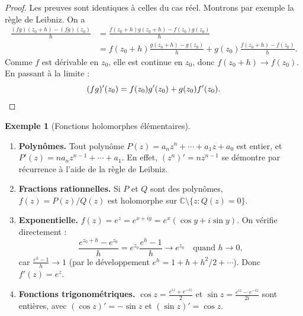 \documentclass[12pt,a4paper,openany]{book}
\theoremstyle{definition}
\newtheorem{exemple}[definition]{Exemple}
\theoremstyle{plain}
\theoremstyle{remark}
\newcommand{\C}{\mathbb{C}}
\begin{document}
\begin{proof}
Les preuves sont identiques à celles du cas réel. Montrons par exemple la règle de Leibniz. On a
\begin{align*}
  \frac{(fg)(z_0+h)-(fg)(z_0)}{h} &= \frac{f(z_0+h)g(z_0+h) - f(z_0)g(z_0)}{h} \\
  &= f(z_0+h)\frac{g(z_0+h)-g(z_0)}{h} + g(z_0)\frac{f(z_0+h)-f(z_0)}{h}.
\end{align*}
Comme $f$ est dérivable en $z_0$, elle est continue en $z_0$, donc $f(z_0+h) \to f(z_0)$. En passant à la limite :
\[
  (fg)'(z_0) = f(z_0)g'(z_0) + g(z_0)f'(z_0). \qedhere
\]
\end{proof}

\begin{exemple}[Fonctions holomorphes élémentaires]\label{ex:holomorphes-elementaires}
\begin{enumerate}[label=(\roman*)]
  \item \textbf{Polynômes.} Tout polynôme $P(z) = a_n z^n + \cdots + a_1 z + a_0$ est entier, et $P'(z) = na_n z^{n-1} + \cdots + a_1$. En effet, $(z^n)' = nz^{n-1}$ se démontre par récurrence à l'aide de la règle de Leibniz.

  \item \textbf{Fractions rationnelles.} Si $P$ et $Q$ sont des polynômes, $f(z) = P(z)/Q(z)$ est holomorphe sur $\C \setminus \{z : Q(z) = 0\}$.

  \item \textbf{Exponentielle.} $f(z) = e^z = e^{x+iy} = e^x(\cos y + i\sin y)$. On vérifie directement :
  \[
    \frac{e^{z_0+h}-e^{z_0}}{h} = e^{z_0}\frac{e^h - 1}{h} \to e^{z_0} \quad \text{quand } h \to 0,
  \]
  car $\frac{e^h-1}{h} \to 1$ (par le développement $e^h = 1 + h + h^2/2 + \cdots$). Donc $f'(z) = e^z$.

  \item \textbf{Fonctions trigonométriques.} $\cos z = \frac{e^{iz}+e^{-iz}}{2}$ et $\sin z = \frac{e^{iz}-e^{-iz}}{2i}$ sont entières, avec $(\cos z)' = -\sin z$ et $(\sin z)' = \cos z$.
\end{enumerate}
\end{exemple}
\end{document}
